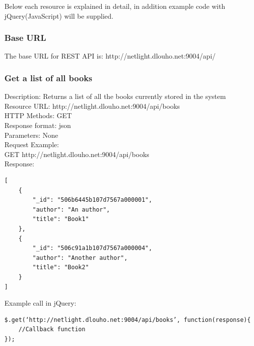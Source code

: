 Below each resource is explained in detail, in addition example code with jQuery(JavaScript) will be supplied.

\subsubsection{Base URL}
The base URL for REST API is: http://netlight.dlouho.net:9004/api/

\subsubsection{Get a list of all books}
Description: Returns a list of all the books currently stored in the system 		\\
\newline
Resource URL: http://netlight.dlouho.net:9004/api/books	\\
HTTP Methods: GET		\\
Response format: json	\\
Parameters: None		\\
\newline
Request Example:		\\
GET			http://netlight.dlouho.net:9004/api/books 	\\
\newline
Response:
\begin{verbatim}
[
    {
        "_id": "506b6445b107d7567a000001",
        "author": "An author",
        "title": "Book1"
    },
    {
        "_id": "506c91a1b107d7567a000004",
        "author": "Another author",
        "title": "Book2"
    }
]
\end{verbatim}
Example call in jQuery:
\begin{verbatim}
$.get(‘http://netlight.dlouho.net:9004/api/books’, function(response){
	//Callback function
});
\end{verbatim}

